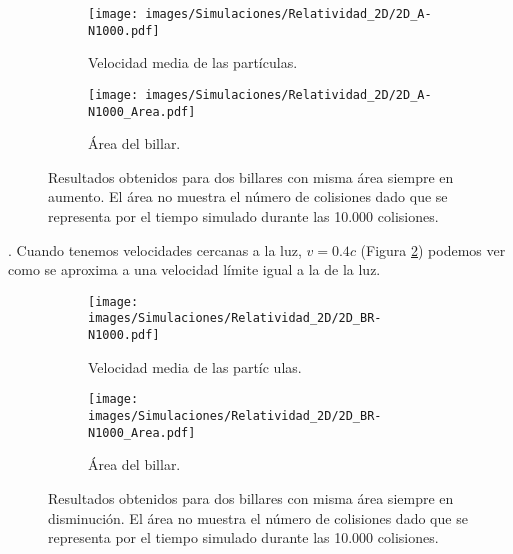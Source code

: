 \vspace{3mm}

\begin{figure}[h]
    \begin{subfigure}[b]{0.5\textwidth}
        \centering
        \texttt{[image: images/Simulaciones/Relatividad\_2D/2D\_A-N1000.pdf]}
        \caption{Velocidad media de las partículas.}
    \end{subfigure}
    \hfill
    \begin{subfigure}[b]{0.5\textwidth}
        \centering
        \texttt{[image: images/Simulaciones/Relatividad\_2D/2D\_A-N1000\_Area.pdf]}
        \caption{Área del billar.}
    \end{subfigure}
    \caption{Resultados obtenidos para dos billares con misma área siempre en aumento. El área no muestra el número de colisiones dado que se representa por el tiempo simulado durante las 10.000 colisiones.}
    \label{fig:2DR_A-N1000_con_Area}
\end{figure}

. Cuando tenemos velocidades cercanas a la luz, \( v = 0.4c \) (Figura \ref{fig:2DR_BR-N1000_con_Area}) podemos ver como se aproxima a una velocidad límite igual a la de la luz. 

\begin{figure}[!h]
    \begin{subfigure}[b]{0.5\textwidth}
        \centering
        \texttt{[image: images/Simulaciones/Relatividad\_2D/2D\_BR-N1000.pdf]}
        \caption{Velocidad media de las partíc  ulas.}
    \end{subfigure}
    \hfill
    \begin{subfigure}[b]{0.5\textwidth}
        \centering
        \texttt{[image: images/Simulaciones/Relatividad\_2D/2D\_BR-N1000\_Area.pdf]}
        \caption{Área del billar.}
    \end{subfigure}
    \caption{Resultados obtenidos para dos billares con misma área siempre en disminución. El área no muestra el número de colisiones dado que se representa por el tiempo simulado durante las 10.000 colisiones.}
    \label{fig:2DR_BR-N1000_con_Area}
\end{figure}

